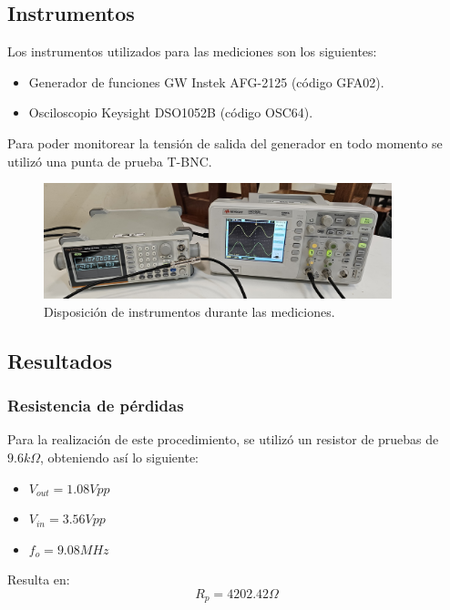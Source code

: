 \documentclass{article}
\begin{document}
\subsection{Instrumentos}
Los instrumentos utilizados para las mediciones son los siguientes:
\begin{itemize}
    \item Generador de funciones GW Instek AFG-2125 (código GFA02).
    \item Osciloscopio Keysight DSO1052B (código OSC64).
\end{itemize}
\noindent Para poder monitorear la tensión de salida del generador en todo momento se utilizó una punta de prueba T-BNC.
\begin{figure}[H]
\centering
\includegraphics[width=0.9\textwidth]{./img/figura29.jpg}
\caption{Disposición de instrumentos durante las mediciones.}
\label{fig:circuito29}
\end{figure}
\subsection{Resultados}
\subsubsection{Resistencia de pérdidas}
Para la realización de este procedimiento, se utilizó un resistor de pruebas de $9.6 k\Omega$, obteniendo así lo siguiente:
\begin{itemize}
    \item $V_{out}=1.08 Vpp$
    \item $V_{in}=3.56 Vpp$
    \item $f_o=9.08 MHz$
\end{itemize}
\noindent Resulta en:
\begin{equation*}
    R_p = 4202.42 \Omega
\end{equation*}
\end{document}

